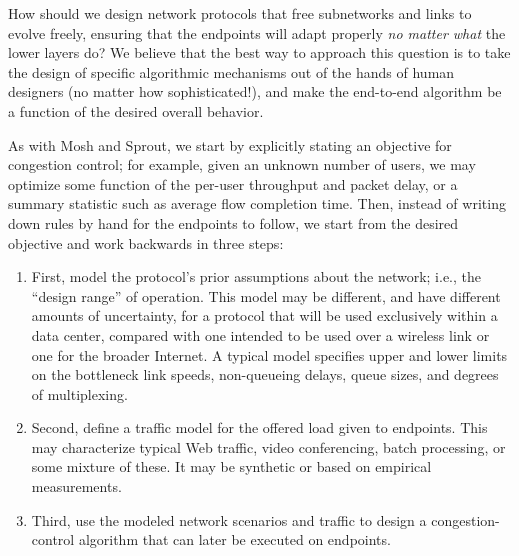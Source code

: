\documentclass{article}
\begin{document}
How should we design network protocols that free subnetworks and links
to evolve freely, ensuring that the endpoints will adapt properly
\emph{no matter what} the lower layers do?  We believe that the best
way to approach this question is to take the design of specific
algorithmic mechanisms out of the hands of human designers (no matter
how sophisticated!), and make the end-to-end algorithm be a function
of the desired overall behavior.


As with Mosh and Sprout, we start by explicitly stating an 
  objective for congestion control; for example, given an unknown
number of users, we may optimize some function of the per-user
throughput and packet delay, or a summary statistic such as average
flow completion time. Then, instead of writing down rules by hand for
the endpoints to follow, we start from the desired objective and work
backwards in three steps:



\begin{enumerate}

\item First, model the protocol's prior assumptions about the network;
  i.e., the ``design range'' of operation. This model
  may be different, and have different amounts of uncertainty, for a
  protocol that will be used exclusively within a data center,
  compared with one intended to be used over a wireless link or one
  for the broader Internet. A typical model specifies upper and lower
  limits on the bottleneck link speeds, non-queueing delays, queue
  sizes, and degrees of multiplexing.

\item Second, define a traffic model for the offered load given to
  endpoints. This may characterize typical Web traffic, video
  conferencing, batch processing, or some mixture of these. It may
  be synthetic or based on empirical measurements.

\item Third, use the modeled network scenarios and traffic to design a
  congestion-control algorithm that can later be executed on endpoints.

\end{enumerate}
\end{document}

